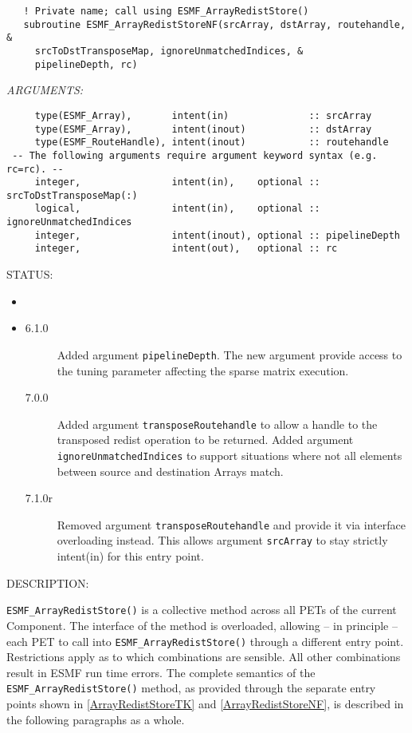   
\begin{verbatim}   ! Private name; call using ESMF_ArrayRedistStore()
   subroutine ESMF_ArrayRedistStoreNF(srcArray, dstArray, routehandle, &
     srcToDstTransposeMap, ignoreUnmatchedIndices, &
     pipelineDepth, rc)\end{verbatim}{\em ARGUMENTS:}
\begin{verbatim}     type(ESMF_Array),       intent(in)              :: srcArray
     type(ESMF_Array),       intent(inout)           :: dstArray
     type(ESMF_RouteHandle), intent(inout)           :: routehandle
 -- The following arguments require argument keyword syntax (e.g. rc=rc). --
     integer,                intent(in),    optional :: srcToDstTransposeMap(:)
     logical,                intent(in),    optional :: ignoreUnmatchedIndices
     integer,                intent(inout), optional :: pipelineDepth
     integer,                intent(out),   optional :: rc\end{verbatim}
{\sf STATUS:}
   \begin{itemize}
   \item{}
   \item{}
   \begin{description}
   \item[6.1.0] Added argument {\tt pipelineDepth}.
                The new argument provide access to the tuning parameter
                affecting the sparse matrix execution.
   \item[7.0.0] Added argument {\tt transposeRoutehandle} to allow a handle to
                the transposed redist operation to be returned.\newline
                Added argument {\tt ignoreUnmatchedIndices} to support situations 
                where not all elements between source and destination Arrays 
                match.
   \item[7.1.0r] Removed argument {\tt transposeRoutehandle} and provide it
                via interface overloading instead. This allows argument 
                {\tt srcArray} to stay strictly intent(in) for this entry point.
   \end{description}
   \end{itemize}
  
{\sf DESCRIPTION:\\ }


   \label{ArrayRedistStoreNF}
   {\tt ESMF\_ArrayRedistStore()} is a collective method across all PETs of the
   current Component. The interface of the method is overloaded, allowing 
   -- in principle -- each PET to call into {\tt ESMF\_ArrayRedistStore()}
   through a different entry point. Restrictions apply as to which combinations
   are sensible. All other combinations result in ESMF run time errors. The
   complete semantics of the {\tt ESMF\_ArrayRedistStore()} method, as provided
   through the separate entry points shown in \ref{ArrayRedistStoreTK} and
   \ref{ArrayRedistStoreNF}, is described in the following paragraphs as a whole.
  
